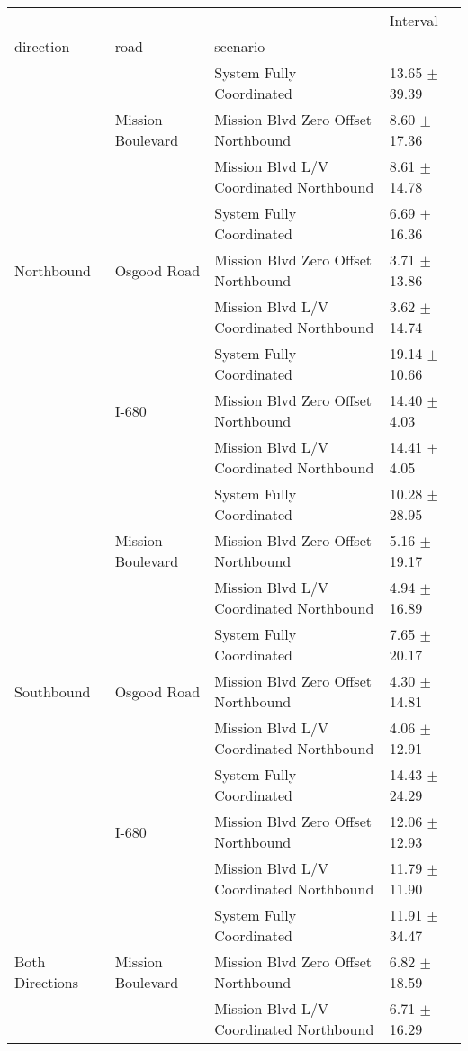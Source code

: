 \begin{tabular}{llll}
\toprule
 &  &  & Interval \\
direction & road & scenario &  \\
\midrule
\multirow[t]{9}{*}{Northbound} & \multirow[t]{3}{*}{Mission Boulevard} & System Fully Coordinated & 13.65 $\pm$ 39.39 \\
 &  & Mission Blvd Zero Offset Northbound & 8.60 $\pm$ 17.36 \\
 &  & Mission Blvd L/V Coordinated Northbound & 8.61 $\pm$ 14.78 \\
 & \multirow[t]{3}{*}{Osgood Road} & System Fully Coordinated & 6.69 $\pm$ 16.36 \\
 &  & Mission Blvd Zero Offset Northbound & 3.71 $\pm$ 13.86 \\
 &  & Mission Blvd L/V Coordinated Northbound & 3.62 $\pm$ 14.74 \\
 & \multirow[t]{3}{*}{I-680} & System Fully Coordinated & 19.14 $\pm$ 10.66 \\
 &  & Mission Blvd Zero Offset Northbound & 14.40 $\pm$ 4.03 \\
 &  & Mission Blvd L/V Coordinated Northbound & 14.41 $\pm$ 4.05 \\
\multirow[t]{9}{*}{Southbound} & \multirow[t]{3}{*}{Mission Boulevard} & System Fully Coordinated & 10.28 $\pm$ 28.95 \\
 &  & Mission Blvd Zero Offset Northbound & 5.16 $\pm$ 19.17 \\
 &  & Mission Blvd L/V Coordinated Northbound & 4.94 $\pm$ 16.89 \\
 & \multirow[t]{3}{*}{Osgood Road} & System Fully Coordinated & 7.65 $\pm$ 20.17 \\
 &  & Mission Blvd Zero Offset Northbound & 4.30 $\pm$ 14.81 \\
 &  & Mission Blvd L/V Coordinated Northbound & 4.06 $\pm$ 12.91 \\
 & \multirow[t]{3}{*}{I-680} & System Fully Coordinated & 14.43 $\pm$ 24.29 \\
 &  & Mission Blvd Zero Offset Northbound & 12.06 $\pm$ 12.93 \\
 &  & Mission Blvd L/V Coordinated Northbound & 11.79 $\pm$ 11.90 \\
\multirow[t]{9}{*}{Both Directions} & \multirow[t]{3}{*}{Mission Boulevard} & System Fully Coordinated & 11.91 $\pm$ 34.47 \\
 &  & Mission Blvd Zero Offset Northbound & 6.82 $\pm$ 18.59 \\
 &  & Mission Blvd L/V Coordinated Northbound & 6.71 $\pm$ 16.29 \\

\end{tabular}
